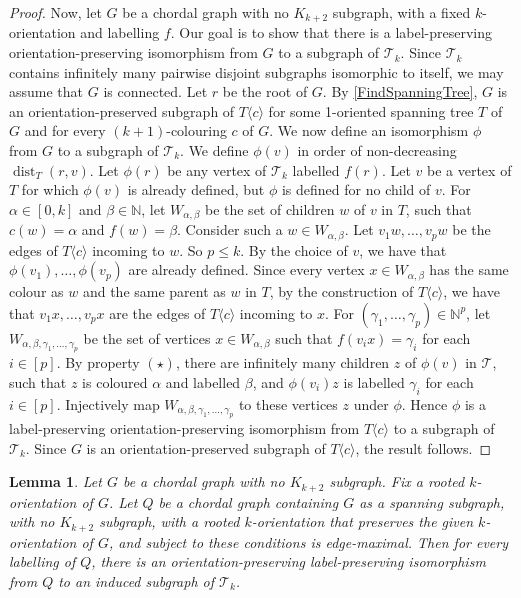 \documentclass[a4paper,11pt]{article}
\theoremstyle{plain}
\newtheorem{lem}[thm]{Lemma}
\theoremstyle{definition}
\renewcommand{\leq}{\leqslant}
\DeclareMathOperator{\dist}{dist}
\newcommand{\TT}{\mathcal{T}}
\newcommand{\NN}{\mathbb{N}}
\newcommand{\GGG}[2]{#1\langle{#2}\rangle}
\begin{document}
\begin{proof}
Now, let $G$ be a chordal graph with no $K_{k+2}$ subgraph, with a fixed $k$-orientation and labelling $f$. Our goal is to show that there is a label-preserving orientation-preserving isomorphism from $G$ to a subgraph of $\TT_k$. Since $\TT_k$ contains infinitely many pairwise disjoint subgraphs isomorphic to itself, we may assume that $G$ is connected. Let $r$ be the root of $G$. By \cref{FindSpanningTree}, $G$ is an orientation-preserved subgraph of $\GGG{T}{c}$ for some 1-oriented spanning tree $T$ of $G$ and for every $(k+1)$-colouring $c$ of $G$. 
We now define an isomorphism $\phi$ from $G$ to a subgraph of $\TT_k$. We define $\phi(v)$ in order of non-decreasing $\dist_T(r,v)$. Let $\phi(r)$ be any vertex of $\TT_k$ labelled $f(r)$. Let $v$ be a vertex of $T$ for which $\phi(v)$ is already defined, but $\phi$ is defined for no child of $v$. For $\alpha\in[0,k]$ and $\beta\in\NN$, let $W_{\alpha,\beta}$ be the set of children $w$ of $v$ in $T$, such that $c(w)=\alpha$ and $f(w)=\beta$. Consider such a $w\in W_{\alpha,\beta}$. Let $v_1w,\dots,v_pw$ be the edges of $\GGG{T}{c}$ incoming to $w$. So $p\leq k$. By the choice of $v$, we have that $\phi(v_1),\dots,\phi(v_p)$ are already defined. Since every vertex $x\in W_{\alpha,\beta}$ has the same colour as $w$ and the same parent as $w$ in $T$, by the construction of $\GGG{T}{c}$, we have that $v_1x,\dots,v_px$ are the edges of $\GGG{T}{c}$ incoming to $x$. For $(\gamma_1,\dots,\gamma_p)\in \NN^p$, let $W_{\alpha,\beta,\gamma_1,\dots,\gamma_p}$ be the set of vertices $x\in W_{\alpha,\beta}$ such that $f(v_ix)=\gamma_i$ for each $i\in[p]$. 
By property $(\star)$, there are infinitely many children $z$ of $\phi(v)$ in $\TT$, such that $z$ is coloured $\alpha$ and labelled $\beta$, and $\phi(v_i)z$ is labelled $\gamma_i$ for each $i\in[p]$. Injectively map $W_{\alpha,\beta,\gamma_1,\dots,\gamma_p}$ to these vertices $z$ under $\phi$. Hence $\phi$ is a label-preserving orientation-preserving isomorphism from $\GGG{T}{c}$ to a subgraph of $\TT_k$. Since $G$ is an orientation-preserved subgraph of $\GGG{T}{c}$, the result follows. 
\end{proof}

\begin{lem}
\label{Maximal}
Let $G$ be a chordal graph with no $K_{k+2}$ subgraph. Fix a rooted $k$-orientation of $G$. Let $Q$ be a chordal graph containing $G$ as a spanning subgraph, with no $K_{k+2}$ subgraph, with a rooted $k$-orientation that preserves the given $k$-orientation of $G$, and subject to these conditions is edge-maximal. Then for every labelling of $Q$, there is an orientation-preserving label-preserving isomorphism from $Q$ to an induced subgraph of $\TT_k$. \end{lem}
\end{document}
